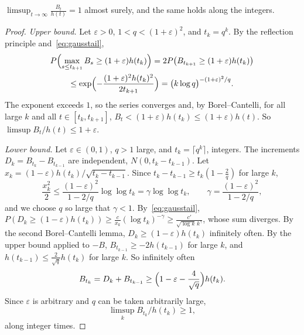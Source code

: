 \begin{theorem}\label{thm:lilbm}
$\displaystyle\limsup_{t\to\infty}\frac{B_t}{h(t)}=1$ almost surely, and the same holds along the integers.
\end{theorem}
\begin{proof}
\emph{Upper bound.} Let $\varepsilon>0$, $1<q<(1+\varepsilon)^2$, and $t_k=q^k$. By the reflection principle and~\eqref{eq:gausstail},
\[
\begin{gathered}
P\Bigl(\max_{s\le t_{k+1}}B_s\ge(1+\varepsilon)h(t_k)\Bigr)=2P\bigl(B_{t_{k+1}}\ge(1+\varepsilon)h(t_k)\bigr)\\\le\exp\Bigl(-\frac{(1+\varepsilon)^2h(t_k)^2}{2t_{k+1}}\Bigr)=\bigl(k\log q\bigr)^{-(1+\varepsilon)^2/q}.
\end{gathered}
\]
The exponent exceeds $1$, so the series converges and, by Borel--Cantelli, for all large $k$ and all $t\in[t_k,t_{k+1}]$, $B_t<(1+\varepsilon)h(t_k)\le(1+\varepsilon)h(t)$. So
$\limsup B_t/h(t)\le1+\varepsilon$.

\emph{Lower bound.} Let $\varepsilon\in(0,1)$, $q>1$ large, and $t_k=\lceil q^k\rceil$, integers. The increments $D_k=B_{t_k}-B_{t_{k-1}}$ are independent, $N(0,t_k-t_{k-1})$. Let
$x_k=(1-\varepsilon)h(t_k)/\sqrt{t_k-t_{k-1}}$. Since $t_k-t_{k-1}\ge t_k(1-\frac2q)$ for large $k$,
\[
\frac{x_k^2}2\le\frac{(1-\varepsilon)^2}{1-2/q}\log\log t_k=\gamma\log\log t_k,\qquad\gamma=\frac{(1-\varepsilon)^2}{1-2/q},
\]
and we choose $q$ so large that $\gamma<1$. By~\eqref{eq:gausstail}, $P(D_k\ge(1-\varepsilon)h(t_k))\ge\frac c{x_k}(\log t_k)^{-\gamma}\ge\frac{c'}{\sqrt{\log k}\,k^\gamma}$, whose sum diverges. By the
second Borel--Cantelli lemma, $D_k\ge(1-\varepsilon)h(t_k)$ infinitely often. By the upper bound applied to $-B$, $B_{t_{k-1}}\ge-2h(t_{k-1})$ for large $k$, and $h(t_{k-1})\le
\frac2{\sqrt q}h(t_k)$ for large $k$. So infinitely often
\[
B_{t_k}=D_k+B_{t_{k-1}}\ge\Bigl(1-\varepsilon-\frac4{\sqrt q}\Bigr)h(t_k).
\]
Since $\varepsilon$ is arbitrary and $q$ can be taken arbitrarily large,
\[
\limsup_kB_{t_k}/h(t_k)\ge1,
\]
along integer times.
\end{proof}

